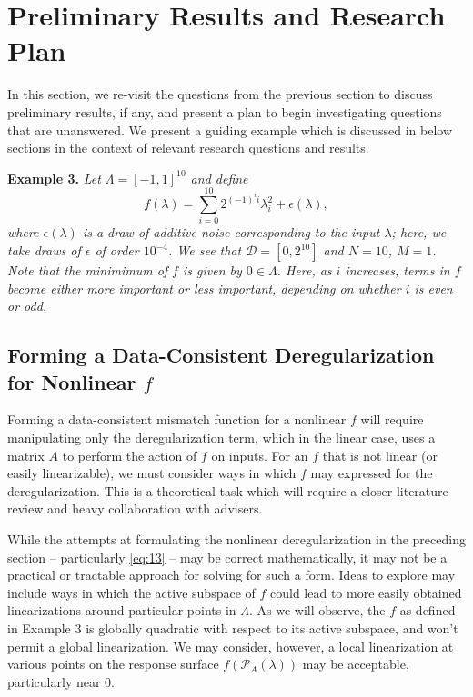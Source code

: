 \documentclass{amsart}
\begin{document}



\section{Preliminary Results and Research Plan}

In this section, we re-visit the questions from the previous section to discuss preliminary results, if any, and present a plan to begin investigating questions that are unanswered. We present a guiding example which is discussed in below sections in the context of relevant research questions and results.

\vspace{.125cm}

\noindent \textbf{Example 3.} \textit{Let $\Lambda=[-1,1]^{10}$ and define $$f(\lambda)=\sum_{i=0}^{10} 2^{(-1)^i i}\lambda_i^2+\epsilon(\lambda),$$ where $\epsilon(\lambda)$ is a draw of additive noise corresponding to the input $\lambda$; here, we take draws of $\epsilon$ of order $10^{-4}$. We see that $\mathcal{D}=[0,2^{10}]$ and $N=10$, $M=1$. Note that the minimimum of $f$ is given by $0 \in \Lambda$. Here, as $i$ increases, terms in $f$ become either more important or less important, depending on whether $i$ is even or odd.}

\subsection{Forming a Data-Consistent Deregularization for Nonlinear $f$} Forming a data-consistent mismatch function for a nonlinear $f$ will require manipulating only the deregularization term, which in the linear case, uses a matrix $A$ to perform the action of $f$ on inputs. For an $f$ that is not linear (or easily linearizable), we must consider ways in which $f$ may expressed for the deregularization. This is a theoretical task which will require a closer literature review and heavy collaboration with advisers.

While the attempts at formulating the nonlinear deregularization in the preceding section -- particularly \eqref{eq:13} -- may be correct mathematically, it may not be a practical or tractable approach for solving for such a form. Ideas to explore may include ways in which the active subspace of $f$ could lead to more easily obtained linearizations around particular points in $\Lambda$. As we will observe, the $f$ as defined in Example 3 is globally quadratic with respect to its active subspace, and won't permit a global linearization. We may consider, however, a local linearization at various points on the response surface $f(\mathcal{P}_A(\lambda))$ may be acceptable, particularly near 0.
\end{document}
